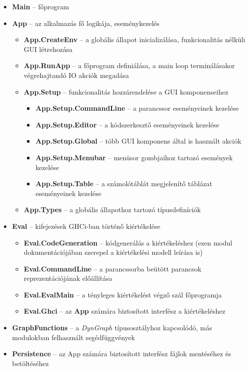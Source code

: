 \begin{itemize}
	\item \textbf{Main} -- főprogram
	\item \textbf{App} -- az alkalmazás fő logikája, eseménykezelés
	\begin{itemize}
		\item \textbf{App.CreateEnv} -- a globális állapot inicializálása, funkcionalitás nélküli GUI létrehozása
		\item \textbf{App.RunApp} -- a főprogram definiálása, a main loop terminálásakor végrehajtandó IO akciók megadása
		\item \textbf{App.Setup}	-- funkcionalitás hozzárendelése a GUI komponenseihez
		\begin{itemize}
			\item \textbf{App.Setup.CommandLine} -- a parancssor eseményeinek kezelése
			\item \textbf{App.Setup.Editor} -- a kódszerkesztő eseményeinek kezelése
			\item \textbf{App.Setup.Global} -- több GUI komponens által is használt akciók
			\item \textbf{App.Setup.Menubar} -- menüsor gombjaihoz tartozó események kezelése
			\item \textbf{App.Setup.Table} -- a számolótáblát megjelenítő táblázat eseményeinek kezelése
		\end{itemize}
		\item \textbf{App.Types} -- a globális állapothoz tartozó típusdefiníciók
	\end{itemize}
	\item \textbf{Eval} -- kifejezések GHCi-ban történő kiértékelése
	\begin{itemize}
		\item \textbf{Eval.CodeGeneration} -- kódgenerálás a kiértékeléshez (ezen modul dokumentációjában szerepel a kiértékelési modell leírása is)
		\item \textbf{Eval.CommandLine} -- a parancssorba beütött parancsok reprezentációjának előállítása
		\item \textbf{Eval.EvalMain} -- a tényleges kiértékelést végző szál főprogramja
		\item \textbf{Eval.Ghci} -- az \textbf{App} számára biztosított interfész a kiértékeléshez
	\end{itemize}
	\item \textbf{GraphFunctions} -- a \textit{DynGraph} típusosztályhoz kapcsolódó, más modulokban felhasznált segédfüggvények 	
	\item \textbf{Persistence} -- az App számára biztosított interfész fájlok mentéséhez és betöltéséhez

\end{itemize}
